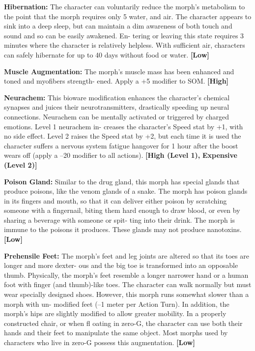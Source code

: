 \textbf{Hibernation:} The character can voluntarily reduce 
the morph's metabolism to the point that the morph 
requires only 5%
water, and air. The character appears to sink into a 
deep sleep, but can maintain a dim awareness of both 
touch and sound and so can be easily awakened. En-
tering or leaving this state requires 3 minutes where 
the character is relatively helpless. With sufficient 
air, characters can safely hibernate for up to 40 days 
without food or water. \textbf{[Low]}

\textbf{Muscle Augmentation:} The morph's muscle mass 
has been enhanced and toned and myofibers strength-
ened. Apply a +5 modifier to SOM. \textbf{[High]}

\textbf{Neurachem:} This bioware modification enhances 
the character's chemical synapses and juices their 
neurotransmitters, drastically speeding up neural 
connections. Neurachem can be mentally activated or 
triggered by charged emotions. Level 1 neurachem in-
creases the character's Speed stat by +1, with no side 
effect. Level 2 raises the Speed stat by +2, but each 
time it is used the character suffers a nervous system 
fatigue hangover for 1 hour after the boost wears off 
(apply a –20 modifier to all actions). \textbf{[High (Level 1), }
\textbf{Expensive (Level 2)]}

\textbf{Poison Gland:} Similar to the drug gland, this 
morph has special glands that produce poisons, 
like the venom glands of a snake. The morph has 
poison glands in its fingers and mouth, so that it can 
deliver either poison by scratching someone with a 
fingernail, biting them hard enough to draw blood, 
or even by sharing a beverage with someone or spit-
ting into their drink. The morph is immune to the 
poisons it produces. These glands may not produce 
nanotoxins. \textbf{[Low]}

\textbf{Prehensile Feet: }The morph's feet and leg joints are 
altered so that its toes are longer and more dexter-
ous and the big toe is transformed into an opposable 
thumb. Physically, the morph's feet resemble a longer 
narrower hand or a human foot with finger  (and 
thumb)-like toes. The character can walk normally 
but must wear specially designed shoes. However, this 
morph runs somewhat slower than a morph with un-
modified feet (–1 meter per Action Turn). In addition, 
the morph's hips are slightly modified to allow greater 
mobility. In a properly constructed chair, or when 
fl oating in zero-G, the character can use both their 
hands and their feet to manipulate the same object. 
Most morphs used by characters who live in zero-G 
possess this augmentation. \textbf{[Low]}


